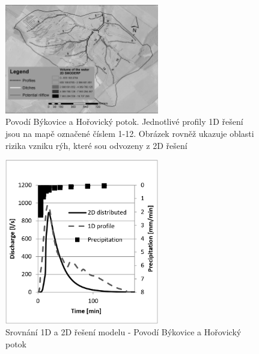 \begin{figure}[t]
\centering
\includegraphics[width=0.6\textwidth]{img/horany_print3.jpg}
\caption{Povodí Býkovice a Hořovický potok. Jednotlivé profily 1D řešení jsou na mapě označené číslem 1-12. Obrázek rovněž ukazuje oblasti rizika vzniku rýh, které sou odvozeny z 2D řešení}
\label{fig:horany1}
\end{figure}%
% 
\begin{figure}[t]
\renewcommand{\figurename}{Graf}
\centering
\includegraphics[width=0.6\textwidth]{graph/1D2Dhorany.png}
\caption{Srovnání 1D a 2D řešení modelu \smod - Povodí Býkovice a Hořovický potok}
\label{graf:graf_1}
\end{figure}

\FloatBarrier


